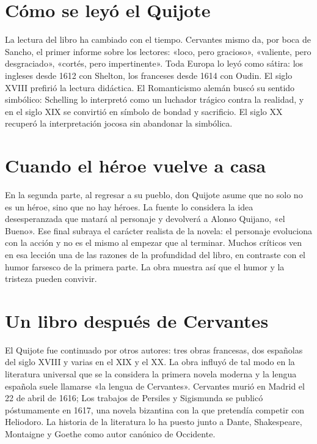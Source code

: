 \documentclass{book}
\begin{document}

\section{Cómo se leyó el Quijote}

La lectura del libro ha cambiado con el tiempo. Cervantes mismo da, por boca de Sancho, el primer informe sobre los lectores: «loco, pero gracioso», «valiente, pero desgraciado», «cortés, pero impertinente». Toda Europa lo leyó como sátira: los ingleses desde 1612 con Shelton, los franceses desde 1614 con Oudin. El siglo XVIII prefirió la lectura didáctica. El Romanticismo alemán buscó su sentido simbólico: Schelling lo interpretó como un luchador trágico contra la realidad, y en el siglo XIX se convirtió en símbolo de bondad y sacrificio. El siglo XX recuperó la interpretación jocosa sin abandonar la simbólica.


\section{Cuando el héroe vuelve a casa}

En la segunda parte, al regresar a su pueblo, don Quijote asume que no solo no es un héroe, sino que no hay héroes. La fuente lo considera la idea desesperanzada que matará al personaje y devolverá a Alonso Quijano, «el Bueno». Ese final subraya el carácter realista de la novela: el personaje evoluciona con la acción y no es el mismo al empezar que al terminar. Muchos críticos ven en esa lección una de las razones de la profundidad del libro, en contraste con el humor farsesco de la primera parte. La obra muestra así que el humor y la tristeza pueden convivir.


\section{Un libro después de Cervantes}

El Quijote fue continuado por otros autores: tres obras francesas, dos españolas del siglo XVIII y varias en el XIX y el XX. La obra influyó de tal modo en la literatura universal que se la considera la primera novela moderna y la lengua española suele llamarse «la lengua de Cervantes». Cervantes murió en Madrid el 22 de abril de 1616; Los trabajos de Persiles y Sigismunda se publicó póstumamente en 1617, una novela bizantina con la que pretendía competir con Heliodoro. La historia de la literatura lo ha puesto junto a Dante, Shakespeare, Montaigne y Goethe como autor canónico de Occidente.
\end{document}
